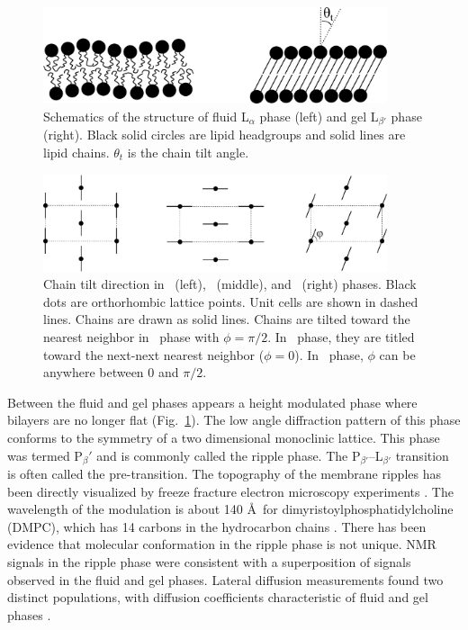 \begin{figure}[htbp]
  \centering
  \includegraphics[width=0.9\textwidth]{figures/ripple/various_phases}
  \caption[]{Schematics of the structure of fluid L$_\alpha$ phase (left) and 
  gel L$_{\beta'}$ phase (right). Black solid circles are lipid headgroups 
  and solid lines are lipid chains. $\theta_t$ is the chain tilt angle.}
  \label{fig:various_phases}
\end{figure}

\begin{figure}[htbp]
  \centering
  \includegraphics[width=0.9\textwidth]{figures/ripple/gel_phase_packing}
  \caption{Chain tilt direction in \LbetaI\ (left), \LbetaF\ (middle), and
  \LbetaL\ (right) phases. Black dots are orthorhombic lattice points.
  Unit cells are shown in dashed lines.
  Chains are drawn as solid lines. Chains are tilted toward the
  nearest neighbor in \LbetaI\ phase with $\phi=\pi/2$. 
  In \LbetaF\ phase, they are titled toward the next-next nearest neighbor
  ($\phi=0$). In \LbetaL\ phase, $\phi$ can be anywhere between 0 and $\pi/2$.}
  \label{fig:gel_phase_packing}
\end{figure}

Between the fluid and gel phases appears a height modulated phase where
bilayers are no longer flat (Fig.~\ref{fig:various_phases}). 
The low angle diffraction pattern of this phase conforms to the symmetry
of a two dimensional monoclinic lattice. This phase was termed P$_\beta'$ 
and is commonly
called the ripple phase. The P$_{\beta'}$--L$_{\beta'}$ transition is often
called the pre-transition.
The topography of the membrane ripples has been directly
visualized by freeze fracture electron microscopy experiments 
\cite{ref:Luna77,ref:Copeland80,ref:Ruppel83,ref:Zasadzinski87,ref:Zasadzinski88}.
The wavelength of the modulation is about 140 \AA\ for 
dimyristoylphosphatidylcholine (DMPC),
which has 14 carbons in the hydrocarbon chains \cite{ref:Wack89}.
There has been evidence that molecular conformation in the ripple phase is not 
unique. NMR signals in the ripple phase \cite{ref:Wittebort81} were consistent
with a superposition of signals observed in the fluid and gel phases.
Lateral diffusion measurements found two distinct populations,
with diffusion coefficients characteristic of fluid and gel phases
\cite{ref:Schneider83}. 



